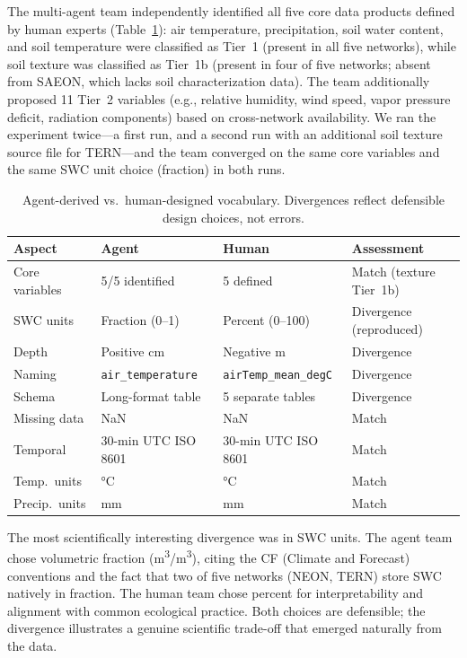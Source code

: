 \documentclass[review,authoryear]{elsarticle}
\begin{document}
The multi-agent team independently identified all five core data products defined by human experts (Table~\ref{tab:vocab}): air temperature, precipitation, soil water content, and soil temperature were classified as Tier~1 (present in all five networks), while soil texture was classified as Tier~1b (present in four of five networks; absent from SAEON, which lacks soil characterization data). The team additionally proposed 11 Tier~2 variables (e.g., relative humidity, wind speed, vapor pressure deficit, radiation components) based on cross-network availability. We ran the experiment twice---a first run, and a second run with an additional soil texture source file for TERN---and the team converged on the same core variables and the same SWC unit choice (fraction) in both runs.

\begin{table}[!ht]
\centering
\caption{Agent-derived vs.\ human-designed vocabulary. Divergences reflect defensible design choices, not errors.}
\label{tab:vocab}
\small
\begin{tabular}{@{}llll@{}}
\toprule
Aspect & Agent & Human & Assessment \\
\midrule
Core variables & 5/5 identified & 5 defined & Match (texture Tier~1b) \\
SWC units & Fraction (0--1) & Percent (0--100) & Divergence (reproduced) \\
Depth & Positive cm & Negative m & Divergence \\
Naming & \texttt{air\_temperature} & \texttt{airTemp\_mean\_degC} & Divergence \\
Schema & Long-format table & 5 separate tables & Divergence \\
Missing data & NaN & NaN & Match \\
Temporal & 30-min UTC ISO 8601 & 30-min UTC ISO 8601 & Match \\
Temp.\ units & \si{\degreeCelsius} & \si{\degreeCelsius} & Match \\
Precip.\ units & mm & mm & Match \\
\bottomrule
\end{tabular}
\end{table}

The most scientifically interesting divergence was in SWC units. The agent team chose volumetric fraction (m\textsuperscript{3}/m\textsuperscript{3}), citing the CF (Climate and Forecast) conventions \citep{cfconventions} and the fact that two of five networks (NEON, TERN) store SWC natively in fraction. The human team chose percent for interpretability and alignment with common ecological practice. Both choices are defensible; the divergence illustrates a genuine scientific trade-off that emerged naturally from the data.
\end{document}
